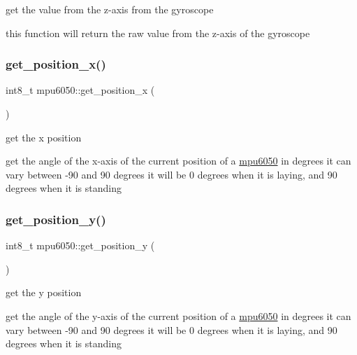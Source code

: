 get the value from the z-\/axis from the gyroscope 

this function will return the raw value from the z-\/axis of the gyroscope \mbox{\label{classmpu6050_abd1ae3f3cdb9dc19c7ae899c733c9714}} 
\subsubsection{\texorpdfstring{get\+\_\+position\+\_\+x()}{get\_position\_x()}}
{\footnotesize\ttfamily int8\+\_\+t mpu6050\+::get\+\_\+position\+\_\+x (\begin{DoxyParamCaption}{ }\end{DoxyParamCaption})}



get the x position 

get the angle of the x-\/axis of the current position of a \hyperlink{classmpu6050}{mpu6050} in degrees it can vary between -\/90 and 90 degrees it will be 0 degrees when it is laying, and 90 degrees when it is standing \mbox{\label{classmpu6050_ac11bddbc6795e1c36b1f89b743ce63ec}} 
\subsubsection{\texorpdfstring{get\+\_\+position\+\_\+y()}{get\_position\_y()}}
{\footnotesize\ttfamily int8\+\_\+t mpu6050\+::get\+\_\+position\+\_\+y (\begin{DoxyParamCaption}{ }\end{DoxyParamCaption})}



get the y position 

get the angle of the y-\/axis of the current position of a \hyperlink{classmpu6050}{mpu6050} in degrees it can vary between -\/90 and 90 degrees it will be 0 degrees when it is laying, and 90 degrees when it is standing \mbox{\label{classmpu6050_aaac23fed6c6abfc50a5e41c5fdcd22e8}} 
